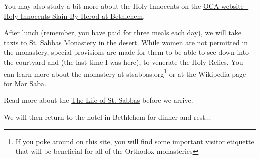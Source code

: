 \documentclass[letterpaper]{report}
\begin{document}
You may also study a bit more about the Holy Innocents on the
\href{https://oca.org/saints/lives/2007/12/29/103682-14000-infants-the-holy-innocents-slain-by-herod-at-bethlehem}{
    OCA website - Holy Innocents Slain By Herod at Bethlehem}. 

After lunch (remember, you have paid for three meals each day),
we will take taxis to St. Sabbas Monastery in the desert.
While women are not permitted in the monastery,
special provisions are made for them to be able to see down into the courtyard 
and (the last time I was here),
to venerate the Holy Relics. You can learn more about the monastery at
\href{http://stsabbas.org/jerusalem.html}{stsabbas.org}\footnote{If you poke 
    around on this site,
    you will find some important visitor etiquette that will 
    be beneficial for all of the Orthodox monasteries}
or at the \href{https://en.wikipedia.org/wiki/Mar_Saba}{
    Wikipedia page for Mar Saba}.

Read more about the 
\href{https://oca.org/saints/lives/2008/12/05/103477-venerable-sava-the-sanctified}{The Life of St. Sabbas} before we arrive.

We will then return to the hotel in Bethlehem for dinner and rest...
\end{document}
